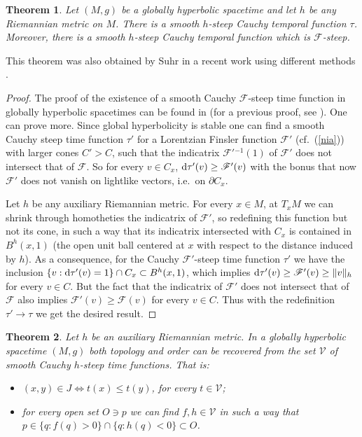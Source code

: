 \documentclass[a4paper]{jpconf}
\newtheorem{theorem}{Theorem}[section]
\theoremstyle{definition}
\theoremstyle{remark}
\newcommand{\p}{\partial}
\newcommand{\dd}{{\rm d}}
\begin{document}
\begin{theorem} \label{spa}
Let $(M,g)$ be a globally hyperbolic spacetime and let $h$ be any Riemannian metric on $M$. There is  a smooth  $h$-steep Cauchy  temporal function $\tau$.
Moreover, there is  a smooth $h$-steep Cauchy  temporal function which is $\mathscr{F}$-steep.
\end{theorem}

This theorem was also obtained by Suhr in a recent work  using different methods \cite[Th.\ 2.3]{suhr15}.

\begin{proof}
 The proof of the existence of a smooth Cauchy $\mathscr{F}$-steep time function in globally hyperbolic spacetimes can be found in \cite{minguzzi16a} (for a previous proof, see \cite{muller11}). One can prove more. Since global hyperbolicity is stable \cite{minguzzi11e,fathi12} one can find a smooth Cauchy steep time function $\tau'$ for a Lorentzian Finsler function $\mathscr{F}'$ (cf.\ (\ref{nia})) with larger cones $C'>C$, such that the indicatrix $\mathscr{F}'{}^{-1}(1)$ of $\mathscr{F}'$ does not intersect that of $\mathscr{F}$. So for every $v \in C_x$,  $\dd \tau'(v) \ge   \mathscr{F}'(v)$ with the bonus that now $\mathscr{F}'$ does not vanish on lightlike vectors, i.e.\ on $\p C_x$.


Let $h$ be any auxiliary Riemannian metric. For every $x\in M$, at $T_xM$ we can shrink through homotheties the indicatrix of $\mathscr{F}'$, so redefining this function but not its cone, in such a way that its indicatrix intersected with $C_x$ is contained in $B^h(x,1)$ (the open unit ball centered at $x$ with respect to the distance induced by $h$). As a consequence, for the Cauchy $\mathscr{F}'$-steep time  function $\tau'$ we have the inclusion $\{v: \dd \tau'(v)=1\}\cap C_x \subset B^h(x,1)$, which implies $\dd \tau'(v) \ge  \mathscr{F}'(v)  \ge \Vert v \Vert_h $ for every $v\in C$. But the fact that the indicatrix of $\mathscr{F}'$ does not intersect that of $\mathscr{F}$ also implies $ \mathscr{F}'(v) \ge   \mathscr{F}(v)$ for every $v\in C$. Thus with the redefinition $\tau' \to \tau$ we get the desired result.
\end{proof}



\begin{theorem} \label{oor}
Let $h$ be an auxiliary Riemannian metric.
In a globally hyperbolic spacetime $(M,g)$ both topology and order can be recovered from the set  $\mathscr{V}$ of smooth Cauchy $h$-steep time  functions. That is:
\begin{itemize}
\item[(a)]
 $(x,y)\in J \Leftrightarrow t(x)\le t(y)$, for every $t\in \mathscr{V}$;
 \item[(b)]  for every open set $O\ni p$ we can find $f,h \in \mathscr{V}$ in such a way that
$p\in \{q\colon f(q)>0\}\cap \{q\colon h(q)<0\}\subset O$.
\end{itemize}
\end{theorem}
\end{document}
